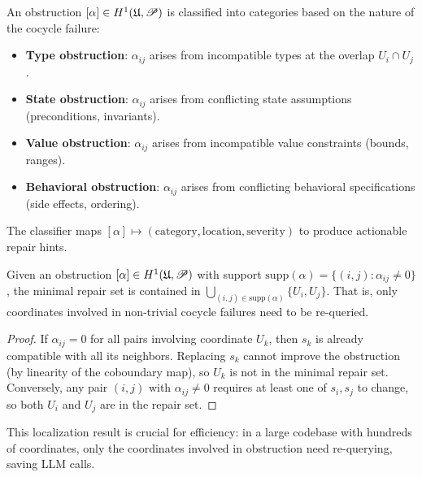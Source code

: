 \documentclass[11pt]{article}
\newcommand{\ProofSheaf}{\mathscr{P}}
\begin{document}
\begin{definition}\label{def:obstruction-class}
An obstruction $[\alpha] \in \Hcoh{1}(\mathfrak{U}, \ProofSheaf)$ is
classified into categories based on the nature of the cocycle failure:
\begin{itemize}
  \item \textbf{Type obstruction}: $\alpha_{ij}$ arises from
    incompatible types at the overlap $U_i \cap U_j$.
  \item \textbf{State obstruction}: $\alpha_{ij}$ arises from
    conflicting state assumptions (preconditions, invariants).
  \item \textbf{Value obstruction}: $\alpha_{ij}$ arises from
    incompatible value constraints (bounds, ranges).
  \item \textbf{Behavioral obstruction}: $\alpha_{ij}$ arises from
    conflicting behavioral specifications (side effects, ordering).
\end{itemize}
The classifier maps $[\alpha] \mapsto (\text{category}, \text{location},
\text{severity})$ to produce actionable repair hints.
\end{definition}

\begin{proposition}\label{prop:localization}
Given an obstruction $[\alpha] \in \Hcoh{1}(\mathfrak{U}, \ProofSheaf)$
with support $\mathrm{supp}(\alpha) = \{(i,j) : \alpha_{ij} \neq 0\}$,
the minimal repair set is contained in
$\bigcup_{(i,j) \in \mathrm{supp}(\alpha)} \{U_i, U_j\}$.
That is, only coordinates involved in non-trivial cocycle failures need
to be re-queried.
\end{proposition}

\begin{proof}
If $\alpha_{ij} = 0$ for all pairs involving coordinate $U_k$, then
$s_k$ is already compatible with all its neighbors.  Replacing $s_k$
cannot improve the obstruction (by linearity of the coboundary map),
so $U_k$ is not in the minimal repair set.  Conversely, any pair
$(i,j)$ with $\alpha_{ij} \neq 0$ requires at least one of
$s_i, s_j$ to change, so both $U_i$ and $U_j$ are in the repair set.
\end{proof}

This localization result is crucial for efficiency: in a large
codebase with hundreds of coordinates, only the coordinates involved
in obstruction need re-querying, saving LLM calls.
\end{document}
